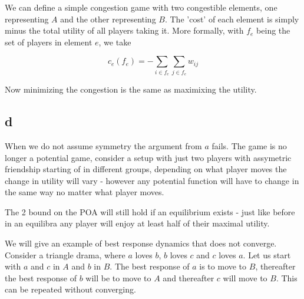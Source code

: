 We can define a simple congestion game with two congestible elements, one representing $A$ and the other representing $B$. The 'cost' of each element is simply minus the total utility of all players taking it. More formally, with $f_e$ being the set of players in element $e$, we take

$$
c_e(f_e) = - \sum_{i \in f_e} \sum_{j \in f_e} w_{ij}
$$

Now minimizing the congestion is the same as maximixing the utility.

\subsection*{d}

When we do not assume symmetry the argument from $a$ fails. The game is no longer a potential game, consider a setup with just two players with assymetric friendship starting of in different groups, depending on what player moves the change in utility will vary - however any potential function will have to change in the same way no matter what player moves. 

The 2 bound on the POA will still hold if an equilibrium exists - just like before in an equilibra any player will enjoy at least half of their maximal utility.

We will give an example of best response dynamics that does not converge. Consider a triangle drama, where $a$ loves $b$, $b$ loves $c$ and $c$ loves $a$. Let us start with $a$ and $c$ in $A$ and $b$ in $B$. The best response of $a$ is to move to $B$, thereafter the best response of $b$ will be to move to $A$ and thereafter $c$ will move to $B$. This can be repeated without converging. 


